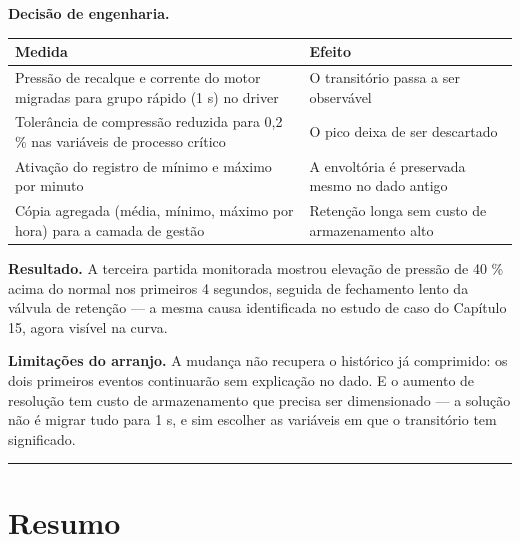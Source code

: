 \textbf{Decisão de engenharia.}

\begin{longtable}[]{@{}
  >{\raggedright\arraybackslash}p{}
  >{\raggedright\arraybackslash}p{}@{}}
\toprule\noalign{}
\begin{minipage}[b]{\linewidth}\raggedright
Medida
\end{minipage} & \begin{minipage}[b]{\linewidth}\raggedright
Efeito
\end{minipage} \\
\midrule\noalign{}
\endhead
\bottomrule\noalign{}
\endlastfoot
Pressão de recalque e corrente do motor migradas para grupo rápido (1 s) no driver & O transitório passa a ser observável \\
Tolerância de compressão reduzida para 0,2 \% nas variáveis de processo crítico & O pico deixa de ser descartado \\
Ativação do registro de mínimo e máximo por minuto & A envoltória é preservada mesmo no dado antigo \\
Cópia agregada (média, mínimo, máximo por hora) para a camada de gestão & Retenção longa sem custo de armazenamento alto \\
\end{longtable}

\textbf{Resultado.} A terceira partida monitorada mostrou elevação de pressão de 40 \% acima do normal nos
primeiros 4 segundos, seguida de fechamento lento da válvula de retenção --- a mesma causa identificada
no estudo de caso do Capítulo 15, agora visível na curva.

\textbf{Limitações do arranjo.} A mudança não recupera o histórico já comprimido: os dois primeiros
eventos continuarão sem explicação no dado. E o aumento de resolução tem custo de armazenamento que
precisa ser dimensionado --- a solução não é migrar tudo para 1 s, e sim escolher as variáveis em que
o transitório tem significado.

\begin{center}\rule{0.5\linewidth}{0.5pt}\end{center}

\section{Resumo}\label{resumo}

